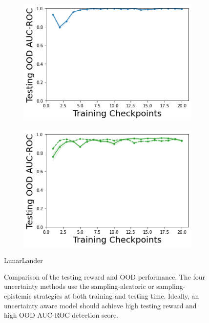 \begin{figure}
\begin{subfigure}{.24\textwidth}
        \includegraphics[width=\textwidth]{sections/011_icml2022/resources/DKL-LunarLanderOOD-v0-AUC-ROC-epistemic_-testing-strategy.png}
    \end{subfigure}
    \begin{subfigure}{.24\textwidth}
        \includegraphics[width=\textwidth]{sections/011_icml2022/resources/PostNet-LunarLanderOOD-v0-AUC-ROC-epistemic_-testing-strategy.png}
    \end{subfigure}
    \vspace{-3mm}
    \caption*{LunarLander}
    \vspace{2mm}
    
    \caption{Comparison of the testing reward and OOD performance. The four uncertainty methods use the sampling-aleatoric or sampling-epistemic strategies at both training and testing time. Ideally, an uncertainty aware model should achieve high testing reward and high OOD AUC-ROC detection score.}
    \label{fig:strategy-testing-performance}
\end{figure}